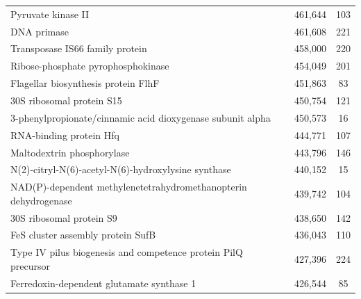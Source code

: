 \begin{singlespace}
\begin{longtable}{p{} cc}
                                                                        Pyruvate kinase II &                     461,644 &           103 \\
                                                                               DNA primase &                     461,608 &           221 \\
                                                           Transposase IS66 family protein &                     458,000 &           220 \\
                                                        Ribose-phosphate pyrophosphokinase &                     454,049 &           201 \\
                                                       Flagellar biosynthesis protein FlhF &                     451,863 &            83 \\
                                                                 30S ribosomal protein S15 &                     450,754 &           121 \\
                                3-phenylpropionate/cinnamic acid dioxygenase subunit alpha &                     450,573 &            16 \\
                                                                   RNA-binding protein Hfq &                     444,771 &           107 \\
                                                                Maltodextrin phosphorylase &                     443,796 &           146 \\
                                       N(2)-citryl-N(6)-acetyl-N(6)-hydroxylysine synthase &                     440,152 &            15 \\
                           NAD(P)-dependent methylenetetrahydromethanopterin dehydrogenase &                     439,742 &           104 \\
                                                                  30S ribosomal protein S9 &                     438,650 &           142 \\
                                                         FeS cluster assembly protein SufB &                     436,043 &           110 \\
                            Type IV pilus biogenesis and competence protein PilQ precursor &                     427,396 &           224 \\
                                                 Ferredoxin-dependent glutamate synthase 1 &                     426,544 &            85 \\

\end{longtable}
\end{singlespace}
